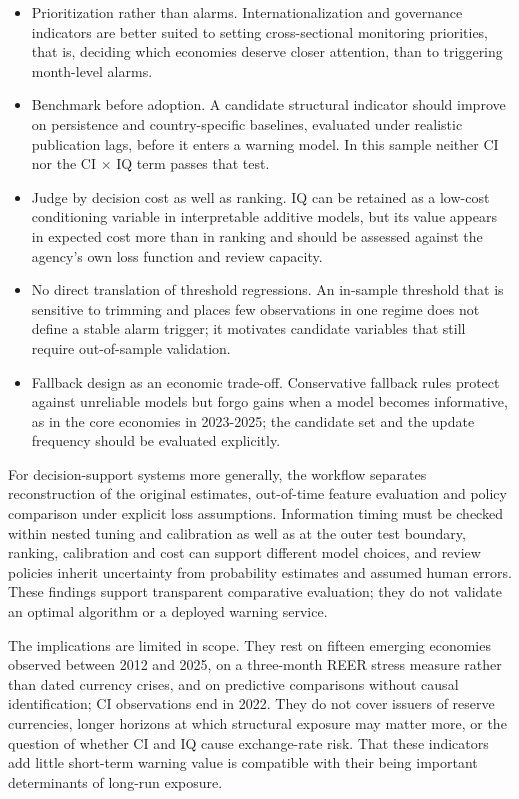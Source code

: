 \documentclass[preprint,12pt,authoryear]{elsarticle}
\begin{document}
\begin{itemize}
\item Prioritization rather than alarms. Internationalization and governance indicators are better suited to setting cross-sectional monitoring priorities, that is, deciding which economies deserve closer attention, than to triggering month-level alarms.
\item Benchmark before adoption. A candidate structural indicator should improve on persistence and country-specific baselines, evaluated under realistic publication lags, before it enters a warning model. In this sample neither CI nor the CI $\times$ IQ term passes that test.
\item Judge by decision cost as well as ranking. IQ can be retained as a low-cost conditioning variable in interpretable additive models, but its value appears in expected cost more than in ranking and should be assessed against the agency's own loss function and review capacity.
\item No direct translation of threshold regressions. An in-sample threshold that is sensitive to trimming and places few observations in one regime does not define a stable alarm trigger; it motivates candidate variables that still require out-of-sample validation.
\item Fallback design as an economic trade-off. Conservative fallback rules protect against unreliable models but forgo gains when a model becomes informative, as in the core economies in 2023-2025; the candidate set and the update frequency should be evaluated explicitly.
\end{itemize}
For decision-support systems more generally, the workflow separates reconstruction of the original estimates, out-of-time feature evaluation and policy comparison under explicit loss assumptions. Information timing must be checked within nested tuning and calibration as well as at the outer test boundary, ranking, calibration and cost can support different model choices, and review policies inherit uncertainty from probability estimates and assumed human errors. These findings support transparent comparative evaluation; they do not validate an optimal algorithm or a deployed warning service.

The implications are limited in scope. They rest on fifteen emerging economies observed between 2012 and 2025, on a three-month REER stress measure rather than dated currency crises, and on predictive comparisons without causal identification; CI observations end in 2022. They do not cover issuers of reserve currencies, longer horizons at which structural exposure may matter more, or the question of whether CI and IQ cause exchange-rate risk. That these indicators add little short-term warning value is compatible with their being important determinants of long-run exposure.
\end{document}
